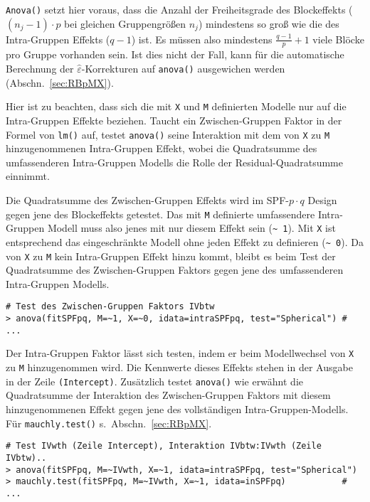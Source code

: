 \lstinline!Anova()! setzt hier voraus, dass die Anzahl der Freiheitsgrade des Blockeffekts ($(n_{j}-1) \cdot p$ bei gleichen Gruppengrößen $n_{j}$) mindestens so groß wie die des Intra-Gruppen Effekts ($q-1$) ist. Es müssen also mindestens $\frac{q-1}{p} + 1$ viele Blöcke pro Gruppe vorhanden sein. Ist dies nicht der Fall, kann für die automatische Berechnung der $\hat{\varepsilon}$-Korrekturen auf \lstinline!anova()! ausgewichen werden (Abschn.\ \ref{sec:RBpMX}).

Hier ist zu beachten, dass sich die mit \lstinline!X! und \lstinline!M! definierten Modelle nur auf die Intra-Gruppen Effekte beziehen. Taucht ein Zwischen-Gruppen Faktor in der Formel von \lstinline!lm()! auf, testet \lstinline!anova()! seine Interaktion mit dem von \lstinline!X! zu \lstinline!M! hinzugenommenen Intra-Gruppen Effekt, wobei die Quadratsumme des umfassenderen Intra-Gruppen Modells die Rolle der Residual-Quadratsumme einnimmt.

Die Quadratsumme des Zwischen-Gruppen Effekts wird im SPF-$p \cdot q$ Design gegen jene des Blockeffekts getestet. Das mit \lstinline!M! definierte umfassendere Intra-Gruppen Modell muss also jenes mit nur diesem Effekt sein (\lstinline!~ 1!). Mit \lstinline!X! ist entsprechend das eingeschränkte Modell ohne jeden Effekt zu definieren (\lstinline!~ 0!). Da von \lstinline!X! zu \lstinline!M! kein Intra-Gruppen Effekt hinzu kommt, bleibt es beim Test der Quadratsumme des Zwischen-Gruppen Faktors gegen jene des umfassenderen Intra-Gruppen Modells.
\begin{lstlisting}
# Test des Zwischen-Gruppen Faktors IVbtw
> anova(fitSPFpq, M=~1, X=~0, idata=intraSPFpq, test="Spherical") # ...
\end{lstlisting}

Der Intra-Gruppen Faktor lässt sich testen, indem er beim Modellwechsel von \lstinline!X! zu \lstinline!M! hinzugenommen wird. Die Kennwerte dieses Effekts stehen in der Ausgabe in der Zeile \lstinline!(Intercept)!. Zusätzlich testet \lstinline!anova()! wie erwähnt die Quadratsumme der Interaktion des Zwischen-Gruppen Faktors mit diesem hinzugenommenen Effekt gegen jene des vollständigen Intra-Gruppen-Modells. Für \lstinline!mauchly.test()! s.\ Abschn.\ \ref{sec:RBpMX}.
\begin{lstlisting}
# Test IVwth (Zeile Intercept), Interaktion IVbtw:IVwth (Zeile IVbtw)..
> anova(fitSPFpq, M=~IVwth, X=~1, idata=intraSPFpq, test="Spherical")
> mauchly.test(fitSPFpq, M=~IVwth, X=~1, idata=inSPFpq)           # ...
\end{lstlisting}

